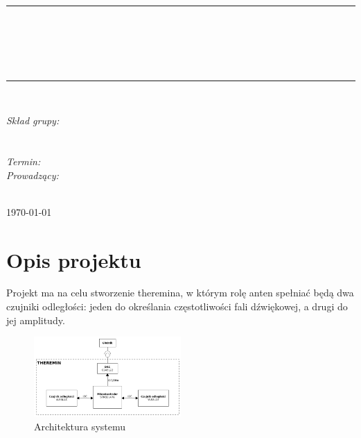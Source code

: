 \documentclass[10pt, a4paper]{article}
\begin{document}
\def\tablename{Tabela}	%

\begin{titlepage}
	\begin{center}
		\textsc{\LARGE \formakursu}\\[1cm]		
		\textsc{\Large \kurs}\\[0.5cm]		
		\rule{\textwidth}{0.08cm}\\[0.4cm]
		{\huge \bfseries \doctype}\\[1cm]
		{\huge \bfseries \projectname}\\[0.5cm]
		{\huge \bfseries \acronim}\\[0.4cm]
		\rule{\textwidth}{0.08cm}\\[1cm]
		
		\begin{flushright} \large
		\emph{Skład grupy:}\\
		\osobaA\\
		\osobaB\\[0.4cm]
		
		\emph{Termin: }\termin\\[0.4cm]

		\emph{Prowadzący:} \\
		\prowadzacy \\
		
		\end{flushright}
		
		\vfill
		
		{\large \today}
	\end{center}	
\end{titlepage}

\newpage
\tableofcontents
\newpage

\section{Opis projektu}
\label{sec:OpisProjektu}

Projekt ma na celu stworzenie theremina, w którym rolę anten spełniać będą dwa czujniki odległości: jeden do określania częstotliwości fali dźwiękowej, a drugi do jej amplitudy. 

\begin{figure}[H]
	\centering
	\includegraphics[width=0.5\textwidth]{architektura.png}
	\caption{Architektura systemu}
	\label{fig:Architektura}
\end{figure}
\end{document}
